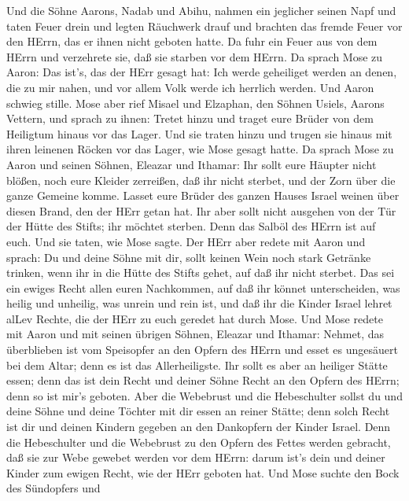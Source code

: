  Und die Söhne Aarons, Nadab und Abihu, nahmen ein jeglicher
seinen Napf und taten Feuer drein und legten Räuchwerk drauf und
brachten das fremde Feuer vor den HErrn, das er ihnen nicht geboten
hatte.  Da fuhr ein Feuer aus von dem HErrn und verzehrete
sie, daß sie starben vor dem HErrn.  Da sprach Mose zu
Aaron: Das ist's, das der HErr gesagt hat: Ich werde geheiliget werden
an denen, die zu mir nahen, und vor allem Volk werde ich herrlich
werden. Und Aaron schwieg stille.  Mose aber rief Misael und
Elzaphan, den Söhnen Usiels, Aarons Vettern, und sprach zu ihnen: Tretet
hinzu und traget eure Brüder von dem Heiligtum hinaus vor das Lager.
 Und sie traten hinzu und trugen sie hinaus mit ihren
leinenen Röcken vor das Lager, wie Mose gesagt hatte.  Da
sprach Mose zu Aaron und seinen Söhnen, Eleazar und Ithamar: Ihr sollt
eure Häupter nicht blößen, noch eure Kleider zerreißen, daß ihr nicht
sterbet, und der Zorn über die ganze Gemeine komme. Lasset eure Brüder
des ganzen Hauses Israel weinen über diesen Brand, den der HErr getan
hat.  Ihr aber sollt nicht ausgehen von der Tür der Hütte
des Stifts; ihr möchtet sterben. Denn das Salböl des HErrn ist auf euch.
Und sie taten, wie Mose sagte.  Der HErr aber redete mit
Aaron und sprach:  Du und deine Söhne mit dir, sollt keinen
Wein noch stark Getränke trinken, wenn ihr in die Hütte des Stifts
gehet, auf daß ihr nicht sterbet. Das sei ein ewiges Recht allen euren
Nachkommen,  auf daß ihr könnet unterscheiden, was heilig
und unheilig, was unrein und rein ist,  und daß ihr die
Kinder Israel lehret alLev Rechte, die der HErr zu euch geredet hat
durch Mose.  Und Mose redete mit Aaron und mit seinen
übrigen Söhnen, Eleazar und Ithamar: Nehmet, das überblieben ist vom
Speisopfer an den Opfern des HErrn und esset es ungesäuert bei dem
Altar; denn es ist das Allerheiligste.  Ihr sollt es aber
an heiliger Stätte essen; denn das ist dein Recht und deiner Söhne Recht
an den Opfern des HErrn; denn so ist mir's geboten.  Aber
die Webebrust und die Hebeschulter sollst du und deine Söhne und deine
Töchter mit dir essen an reiner Stätte; denn solch Recht ist dir und
deinen Kindern gegeben an den Dankopfern der Kinder Israel.
 Denn die Hebeschulter und die Webebrust zu den Opfern des
Fettes werden gebracht, daß sie zur Webe gewebet werden vor dem HErrn:
darum ist's dein und deiner Kinder zum ewigen Recht, wie der HErr
geboten hat.  Und Mose suchte den Bock des Sündopfers und
